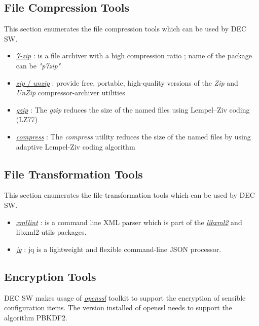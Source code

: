 \documentclass[dec_sum_main.tex]{subfiles}
\begin{document}
\subsection{File Compression Tools}
This section enumerates the file compression tools which can be used by DEC SW.
\par
\begin{itemize}
	\item \href{https://www.7-zip.org/}{\textit{7-zip}} : is a file archiver with a high compression ratio ; name of the package can be \textit{"p7zip"}
	\item \href{http://infozip.sourceforge.net}{\textit{zip} / \textit{unzip}} : provide free, portable, high-quality versions of the \textit{Zip} and \textit{UnZip} compressor-archiver utilities
	\item \href{https://www.gzip.org}{\textit{gzip}} : The \textit{gzip} reduces the size of the named files using Lempel–Ziv coding (LZ77)
	\item \href{http://man7.org/linux/man-pages/man1/compress.1p.html}{\textit{compress}} : The \textit{compress} utility reduces the size of the named files by using adaptive Lempel-Ziv coding algorithm
\end{itemize}

\subsection{File Transformation Tools}
This section enumerates the file transformation tools which can be used by DEC SW.

\begin{itemize}
	\item \href{http://xmlsoft.org/xmllint.html}{\textit{xmllint}} : is a command line XML parser which is part of the \href{http://xmlsoft.org}{\textit{libxml2}} and libxml2-utils packages.
    \item \href{https://stedolan.github.io/jq/}{\textit{jq}} : jq is a lightweight and flexible command-line JSON processor.	
\end{itemize}

\subsection{Encryption Tools}
DEC SW makes usage of \href{https://www.openssl.org/}{\textit{openssl}} toolkit to support the encryption of sensible configuration items. The version installed of openssl needs to support the algorithm PBKDF2.
\end{document}
